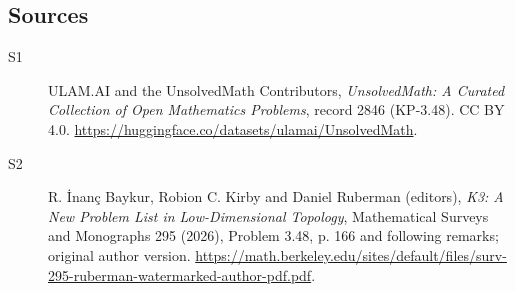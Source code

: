 \documentclass[11pt]{article}
\begin{document}
\subsection{Sources}
\begin{description}
\item[\hypertarget{source:2846:1}{S1}] ULAM.AI and the UnsolvedMath Contributors, \emph{UnsolvedMath: A Curated Collection of Open Mathematics Problems}, record 2846 (KP-3.48). CC BY 4.0. \url{https://huggingface.co/datasets/ulamai/UnsolvedMath}.
\item[\hypertarget{source:2846:2}{S2}] R. İnanç Baykur, Robion C. Kirby and Daniel Ruberman (editors), \emph{K3: A New Problem List in Low-Dimensional Topology}, Mathematical Surveys and Monographs 295 (2026), Problem 3.48, p. 166 and following remarks; original author version. \url{https://math.berkeley.edu/sites/default/files/surv-295-ruberman-watermarked-author-pdf.pdf}.
\end{description}
\label{end:2846}
\end{document}
